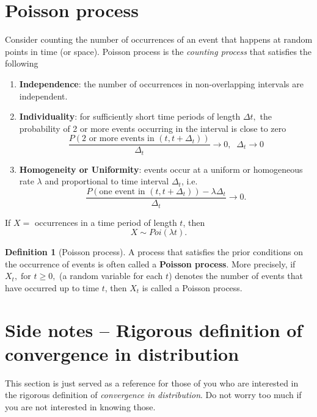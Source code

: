 \documentclass[
]{book}
\theoremstyle{definition}
\newtheorem{definition}{Definition}[chapter]
\theoremstyle{definition}
\theoremstyle{definition}
\theoremstyle{definition}
\theoremstyle{remark}
\begin{document}
\section{Poisson process}\label{poisson-process}

Consider counting the number of occurrences of an event that happens at random points in time (or space). Poisson process is the \emph{counting process} that satisfies the following

\begin{enumerate}
\def\labelenumi{\arabic{enumi}.}
\item
  \textbf{Independence}: the number of occurrences in non-overlapping
  intervals are independent.
\item
  \textbf{Individuality}: for sufficiently short time periods of length
  \(\Delta t,\) the probability of 2 or more events occurring in the interval is
  close to zero
  \[
  \frac{P\left(  \text{2 or more events in }(t,t+\Delta_t)\right)}{\Delta_t}  \rightarrow 0,\;\; \Delta_t \to 0
  \]
\item
  \textbf{Homogeneity or Uniformity}: events occur at a uniform or
  homogeneous rate \(\lambda\) and proportional to time interval \(\Delta_t\), i.e.
  \[
  \frac{P\left(  \text{one event in }(t,t+\Delta_t)\right) - \lambda\Delta_t }{\Delta_t}  \to 0.
  \]
\end{enumerate}

If \(X=\) occurrences in a time period of length \(t\), then
\[X\sim Poi(\lambda t).\]

\begin{definition}[Poisson process]
A process that satisfies the prior conditions on the occurrence of events is often called a \textbf{Poisson process}. More precisely, if \(X_t, \; \text{for } t\ge0,\) (a random variable for each \(t\)) denotes the number of events that have occurred up to time \(t\), then \(X_t\) is called a Poisson process.
\end{definition}

\section{Side notes -- Rigorous definition of convergence in distribution}\label{side-notes-rigorous-definition-of-convergence-in-distribution}

This section is just served as a reference for those of you who are interested in the rigorous definition of \emph{convergence in distribution}. Do not worry too much if you are not interested in knowing those.
\end{document}
